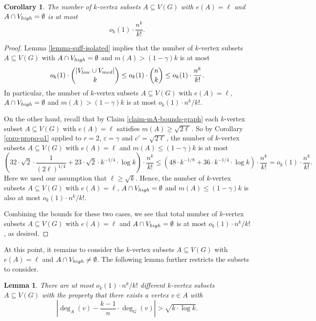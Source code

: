 \documentclass[11pt]{article}
\newtheorem{lemma}[theorem]{Lemma}
\newtheorem{corollary}[theorem]{Corollary}
\theoremstyle{definition}
\numberwithin{equation}{section}
\begin{document}
\begin{corollary}\label{coro-no-Vh}The number of $k$-vertex subsets $A\subseteq V(G)$ with $e(A)=\ell$ and $A\cap V_{\textnormal{high}}=\emptyset$ is at most
\[o_k(1)\cdot \frac{n^k}{k!}.\]
\end{corollary}
\begin{proof}Lemma \ref{lemma-suff-isolated} implies that the number of $k$-vertex subsets $A\subseteq V(G)$ with $A\cap V_{\textnormal{high}}=\emptyset$ and $m(A)>(1-\gamma)k$ is at most
\[o_k(1)\cdot {\vert V_{\textnormal{low}}\cup V_{\textnormal{med}}\vert\choose k}\leq o_k(1)\cdot {n\choose k}\leq o_k(1)\cdot \frac{n^k}{k!}.\]
In particular, the number of $k$-vertex subsets $A\subseteq V(G)$ with $e(A)=\ell$, $A\cap V_{\textnormal{high}}=\emptyset$ and $m(A)>(1-\gamma)k$ is at most $o_k(1)\cdot n^k/k!$.

On the other hand, recall that by Claim \ref{claim-mA-bounds-graph} each $k$-vertex subset $A\subseteq V(G)$ with $e(A)=\ell$ satisfies $m(A)\geq \sqrt{2\ell}$. So by Corollary \ref{coro-propo-o1} applied to $r=2$, $\varepsilon=\gamma$ and $c'=\sqrt{2\ell}$, the number of $k$-vertex subsets $A\subseteq V(G)$ with $e(A)=\ell$ and $m(A)\leq (1-\gamma)k$ is at most
\[\left(32\cdot \sqrt{2}\cdot \frac{1}{(2\ell)^{1/4}}+23 \cdot \sqrt{2}\cdot k^{-1/4}\cdot \log k\right)\cdot \frac{n^k}{k!}\leq  \left(48\cdot k^{-1/8}+36\cdot k^{-1/4}\cdot \log k\right)\cdot \frac{n^k}{k!}=o_k(1)\cdot \frac{n^k}{k!}.\]
Here we used our assumption that $\ell\geq \sqrt{k}$. Hence, the number of $k$-vertex subsets $A\subseteq V(G)$ with $e(A)=\ell$, $A\cap V_{\textnormal{high}}=\emptyset$ and $m(A)\leq (1-\gamma)k$ is also at most $o_k(1)\cdot n^k/k!$.

Combining the bounds for these two cases, we see that total number of $k$-vertex subsets $A\subseteq V(G)$ with $e(A)=\ell$ and $A\cap V_{\textnormal{high}}=\emptyset$ is at most $o_k(1)\cdot n^k/k!$, as desired.
\end{proof}

At this point, it remains to consider the $k$-vertex subsets $A\subseteq V(G)$ with $e(A)=\ell$ and $A\cap V_{\textnormal{high}}\neq \emptyset$. The following lemma further restricts the subsets to consider.

\begin{lemma}\label{lemma-vertex-degree-off}There are at most $o_k(1)\cdot n^k/k!$ different $k$-vertex subsets $A\subseteq V(G)$ with the property that there exists a vertex $v\in A$ with
\[\left\vert\deg_A(v)-\frac{k-1}{n}\cdot \deg_G(v)\right\vert>\sqrt{k\cdot \log k}.\]
\end{lemma}
\end{document}
